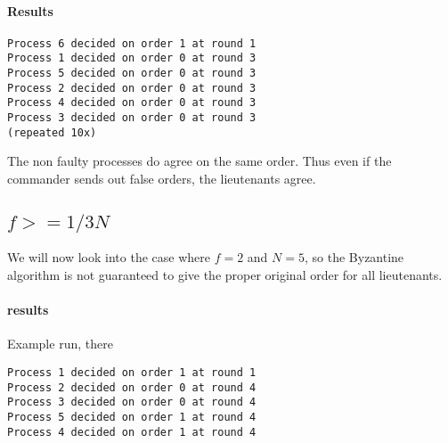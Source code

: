 \documentclass{article}
\begin{document}
\paragraph{Results}
\begin{lstlisting}
Process 6 decided on order 1 at round 1
Process 1 decided on order 0 at round 3
Process 5 decided on order 0 at round 3
Process 2 decided on order 0 at round 3
Process 4 decided on order 0 at round 3
Process 3 decided on order 0 at round 3
(repeated 10x)
\end{lstlisting}

The non faulty processes do agree on the same order. Thus even if the
commander sends out false orders, the lieutenants agree.

\subsection{$f >= 1/3N$ }
We will now look into the case where $f = 2$ and $N = 5$, so the
Byzantine algorithm is not guaranteed to give the proper original
order for all lieutenants.

\paragraph{results}
Example run, there  
\begin{lstlisting}
Process 1 decided on order 1 at round 1
Process 2 decided on order 0 at round 4
Process 3 decided on order 0 at round 4
Process 5 decided on order 1 at round 4
Process 4 decided on order 1 at round 4
\end{lstlisting}
\end{document}
